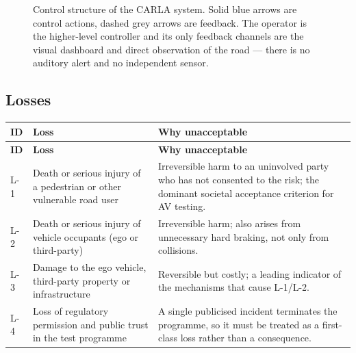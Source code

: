 \documentclass[a4paper,12pt]{article}
\begin{document}
\begin{figure}[ht]
\caption{Control structure of the CARLA system. Solid blue arrows are control actions,
dashed grey arrows are feedback. The operator is the higher-level controller and its only
feedback channels are the visual dashboard and direct observation of the road --- there is
no auditory alert and no independent sensor.}
\label{fig:control-structure}
\end{figure}

\subsection{Losses}

{\small
\begin{longtable}{@{}P{1.0cm}P{4.2cm}P{9.8cm}@{}}
\toprule
\textbf{ID} & \textbf{Loss} & \textbf{Why unacceptable} \\
\midrule
\endfirsthead
\toprule
\textbf{ID} & \textbf{Loss} & \textbf{Why unacceptable} \\
\midrule
\endhead
\bottomrule
\endlastfoot
L-1 & Death or serious injury of a pedestrian or other vulnerable road user
    & Irreversible harm to an uninvolved party who has not consented to the risk; the
      dominant societal acceptance criterion for AV testing. \\
L-2 & Death or serious injury of vehicle occupants (ego or third-party)
    & Irreversible harm; also arises from unnecessary hard braking, not only from
      collisions. \\
L-3 & Damage to the ego vehicle, third-party property or infrastructure
    & Reversible but costly; a leading indicator of the mechanisms that cause L-1/L-2. \\
L-4 & Loss of regulatory permission and public trust in the test programme
    & A single publicised incident terminates the programme, so it must be treated as a
      first-class loss rather than a consequence. \\
\end{longtable}}
\end{document}
